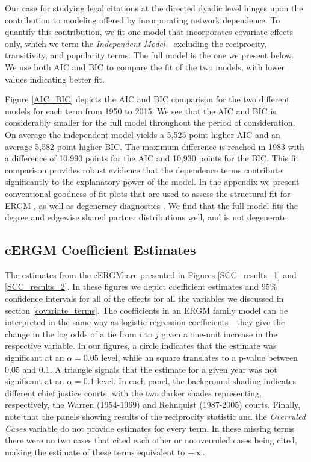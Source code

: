 \documentclass[headsepline=true, abstracton]{scrartcl}
\begin{document}
Our case for studying legal citations at the directed dyadic level hinges upon the contribution to modeling offered by incorporating network dependence. To quantify this contribution, we fit one model that incorporates covariate effects only, which we term the {\em Independent Model}---excluding the reciprocity, transitivity, and popularity terms. The full model is the one we present below. We use both AIC and BIC to compare the fit of the two models, with lower values indicating better fit.  


Figure \ref{AIC_BIC} depicts the AIC and BIC comparison for the two different models for each term from 1950 to 2015. We see that the AIC and BIC is considerably smaller for the full model throughout the period of consideration. On average the independent model yields a 5,525 point higher AIC and an average 5,582 point higher BIC. The maximum difference is reached in 1983 with a difference of 10,990 points for the AIC and 10,930 points for the BIC. This fit comparison provides robust evidence that the dependence terms contribute significantly to the explanatory power of the model. In the appendix we present conventional goodness-of-fit plots that are used to assess the structural fit for ERGM \citep{hunter2008goodness}, as well as degeneracy diagnostics \citep{mukherjee2020degeneracy}. We find that the full model fits the degree and edgewise shared partner distributions well, and is not degenerate.

\subsection{cERGM Coefficient Estimates}
The estimates from the cERGM are presented in Figures \ref{SCC_results_1} and \ref{SCC_results_2}. In these figures we depict coefficient estimates and 95\% confidence intervals for all of the effects for all the variables we discussed in section \ref{covariate_terms}. The coefficients in an ERGM family model can be interpreted in the same way as logistic regression coefficients---they give the change in the log odds of a tie from $i$ to $j$ given a one-unit increase in the respective variable. In our figures, a circle indicates that the estimate was significant at an $\alpha=0.05$ level, while an square translates to a p-value between $0.05$ and $0.1$. A triangle signals that the estimate for a given year was not significant at an $\alpha=0.1$ level. In each panel, the background shading indicates different chief justice courts, with the two darker shades representing, respectively, the Warren (1954-1969) and Rehnquist (1987-2005) courts. Finally, note that the panels showing results of the reciprocity statistic and the \textit{Overruled Cases} variable do not provide estimates for every term. In these missing terms there were no two cases that cited each other or no overruled cases being cited, making the estimate of these terms equivalent to $-\infty$. %
\end{document}
